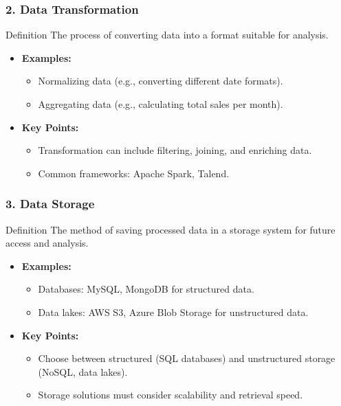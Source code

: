 \documentclass[aspectratio=169]{beamer}
\begin{document}
\begin{frame}[fragile]
    \frametitle{2. Data Transformation}
    \begin{block}{Definition}
        The process of converting data into a format suitable for analysis.
    \end{block}
    \begin{itemize}
        \item \textbf{Examples:}
        \begin{itemize}
            \item Normalizing data (e.g., converting different date formats).
            \item Aggregating data (e.g., calculating total sales per month).
        \end{itemize}
        \item \textbf{Key Points:}
        \begin{itemize}
            \item Transformation can include filtering, joining, and enriching data.
            \item Common frameworks: Apache Spark, Talend.
        \end{itemize}
    \end{itemize}
\end{frame}

\begin{frame}[fragile]
    \frametitle{3. Data Storage}
    \begin{block}{Definition}
        The method of saving processed data in a storage system for future access and analysis.
    \end{block}
    \begin{itemize}
        \item \textbf{Examples:}
        \begin{itemize}
            \item Databases: MySQL, MongoDB for structured data.
            \item Data lakes: AWS S3, Azure Blob Storage for unstructured data.
        \end{itemize}
        \item \textbf{Key Points:}
        \begin{itemize}
            \item Choose between structured (SQL databases) and unstructured storage (NoSQL, data lakes).
            \item Storage solutions must consider scalability and retrieval speed.
        \end{itemize}
    \end{itemize}
\end{frame}
\end{document}
